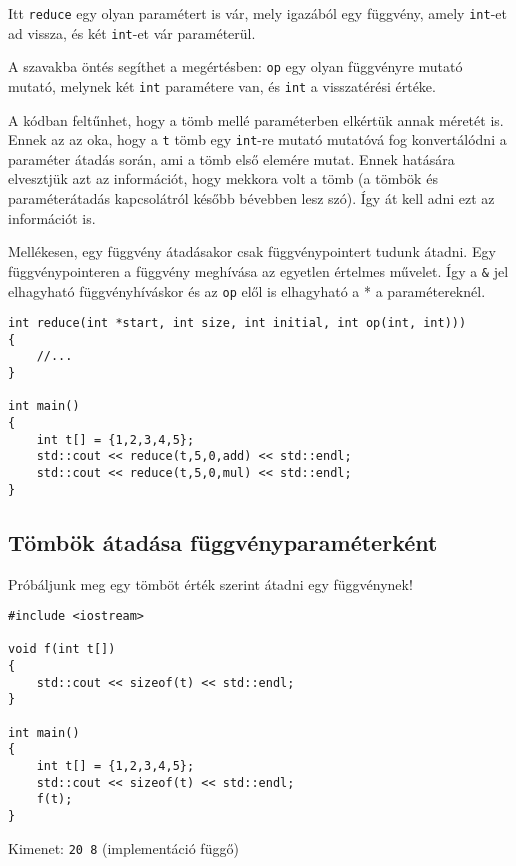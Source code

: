 \documentclass[../cpp_book/cpp_book.tex]{subfiles}
\begin{document}
	Itt \texttt{reduce} egy olyan paramétert is vár, mely igazából egy függvény, amely \texttt{int}-et ad vissza, és két \texttt{int}-et vár paraméterül.
	\begin{note}
		A szavakba öntés segíthet a megértésben: \texttt{op} egy olyan függvényre mutató mutató, melynek két \texttt{int} paramétere van, és \texttt{int} a visszatérési értéke.
	\end{note}
	
	A kódban feltűnhet, hogy a tömb mellé paraméterben elkértük annak méretét is. Ennek az az oka, hogy a \texttt{t} tömb egy \texttt{int}-re mutató mutatóvá fog konvertálódni a paraméter átadás során, ami a tömb első elemére mutat. Ennek hatására elvesztjük azt az információt, hogy mekkora volt a tömb (a tömbök és paraméterátadás kapcsolátról később bévebben lesz szó). Így át kell adni ezt az információt is. 
	
	Mellékesen, egy függvény átadásakor csak függvénypointert tudunk átadni. Egy függvénypointeren a függvény meghívása az egyetlen értelmes művelet. Így a \texttt{\&} jel elhagyható függvényhíváskor és az \texttt{op} elől is elhagyható a * a paramétereknél.
	\begin{lstlisting}
int reduce(int *start, int size, int initial, int op(int, int)))
{
	//...
}

int main()
{
	int t[] = {1,2,3,4,5};
	std::cout << reduce(t,5,0,add) << std::endl;
	std::cout << reduce(t,5,0,mul) << std::endl;
}
	\end{lstlisting}
	\subsection{Tömbök átadása függvényparaméterként}
	Próbáljunk meg egy tömböt érték szerint átadni egy függvénynek!
	\begin{lstlisting}
#include <iostream>

void f(int t[])
{
	std::cout << sizeof(t) << std::endl;
}

int main()
{
	int t[] = {1,2,3,4,5};
	std::cout << sizeof(t) << std::endl;
	f(t);
}
	\end{lstlisting}
	Kimenet: \texttt{20 8} (implementáció függő)
	
\end{document}

